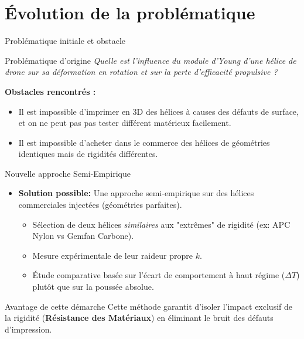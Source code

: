 \documentclass[aspectratio=169]{beamer}
\begin{document}
\section{Évolution de la problématique}

\begin{frame}{Problématique initiale et obstacle}
  \begin{block}{Problématique d'origine}
    \textit{Quelle est l'influence du module d'Young d'une hélice de drone sur sa déformation en rotation et sur la perte d'efficacité propulsive ?}
  \end{block}

  \vspace{0.4cm}
  \textbf{Obstacles rencontrés :}
  \begin{itemize}
    \item Il est \alert{impossible d'imprimer en 3D} des hélices à causes des défauts de surface, et on ne peut pas pas tester différent matérieux facilement.
    \item Il est \alert{impossible d'acheter dans le commerce} des hélices de géométries identiques mais de rigidités différentes.
  \end{itemize}
\end{frame}

\begin{frame}{Nouvelle approche Semi-Empirique}
  \begin{itemize}
    \item \textbf{Solution possible:} Une approche semi-empirique sur des \alert{hélices commerciales} injectées (géométries parfaites).
      \begin{itemize}
        \item Sélection de deux hélices \textit{similaires} aux "extrêmes" de rigidité (ex: APC Nylon vs Gemfan Carbone).
        \item Mesure expérimentale de leur raideur propre $k$.
        \item Étude comparative basée sur l'\alert{écart de comportement à haut régime ($\Delta T$)} plutôt que sur la poussée absolue.
      \end{itemize}
  \end{itemize}

  \vspace{0.3cm}

  \begin{block}{Avantage de cette démarche}
    Cette méthode garantit d'isoler l'impact exclusif de la rigidité (\textbf{Résistance des Matériaux}) en éliminant le bruit des défauts d'impression.
  \end{block}
\end{frame}
\end{document}
